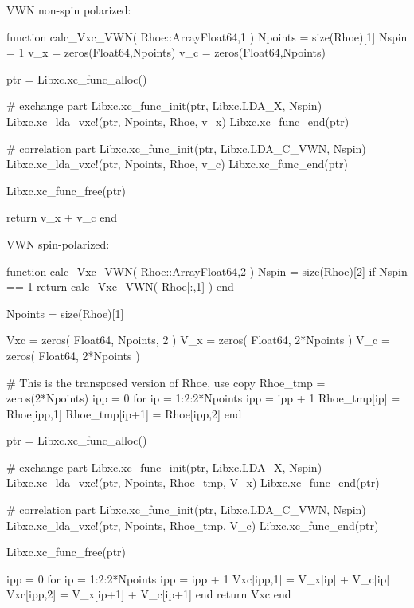 VWN non-spin polarized:
\begin{juliacode}
function calc_Vxc_VWN( Rhoe::Array{Float64,1} )
  Npoints = size(Rhoe)[1]
  Nspin = 1
  v_x = zeros(Float64,Npoints)
  v_c = zeros(Float64,Npoints)

  ptr = Libxc.xc_func_alloc()

  # exchange part
  Libxc.xc_func_init(ptr, Libxc.LDA_X, Nspin)
  Libxc.xc_lda_vxc!(ptr, Npoints, Rhoe, v_x)
  Libxc.xc_func_end(ptr)

  # correlation part
  Libxc.xc_func_init(ptr, Libxc.LDA_C_VWN, Nspin)
  Libxc.xc_lda_vxc!(ptr, Npoints, Rhoe, v_c)
  Libxc.xc_func_end(ptr)

  Libxc.xc_func_free(ptr)
  
  return v_x + v_c
end
\end{juliacode}

VWN spin-polarized:
\begin{juliacode}
function calc_Vxc_VWN( Rhoe::Array{Float64,2} )
  Nspin = size(Rhoe)[2]
  if Nspin == 1
    return calc_Vxc_VWN( Rhoe[:,1] )
  end

  Npoints = size(Rhoe)[1]

  Vxc = zeros( Float64, Npoints, 2 )
  V_x = zeros( Float64, 2*Npoints )
  V_c = zeros( Float64, 2*Npoints )

  # This is the transposed version of Rhoe, use copy
  Rhoe_tmp = zeros(2*Npoints)
  ipp = 0
  for ip = 1:2:2*Npoints
    ipp = ipp + 1
    Rhoe_tmp[ip] = Rhoe[ipp,1]
    Rhoe_tmp[ip+1] = Rhoe[ipp,2]
  end

  ptr = Libxc.xc_func_alloc()

  # exchange part
  Libxc.xc_func_init(ptr, Libxc.LDA_X, Nspin)
  Libxc.xc_lda_vxc!(ptr, Npoints, Rhoe_tmp, V_x)
  Libxc.xc_func_end(ptr)

  # correlation part
  Libxc.xc_func_init(ptr, Libxc.LDA_C_VWN, Nspin)
  Libxc.xc_lda_vxc!(ptr, Npoints, Rhoe_tmp, V_c)
  Libxc.xc_func_end(ptr)

  Libxc.xc_func_free(ptr)

  ipp = 0
  for ip = 1:2:2*Npoints
    ipp = ipp + 1
    Vxc[ipp,1] = V_x[ip] + V_c[ip]
    Vxc[ipp,2] = V_x[ip+1] + V_c[ip+1]
  end
  return Vxc
end
\end{juliacode}

